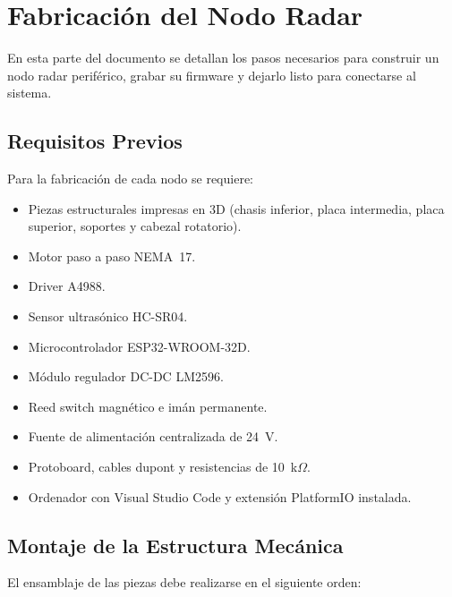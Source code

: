 
\chapter{Fabricación del Nodo Radar}
\label{anexo:fabricacion}

En esta parte del documento se detallan los pasos necesarios para construir un nodo radar periférico, grabar su firmware y dejarlo listo para conectarse al sistema.

\section{Requisitos Previos}

Para la fabricación de cada nodo se requiere:

\begin{itemize}
    \item Piezas estructurales impresas en 3D (chasis inferior, placa intermedia, placa superior, soportes y cabezal rotatorio).
    \item Motor paso a paso NEMA~17.
    \item Driver A4988.
    \item Sensor ultrasónico HC-SR04.
    \item Microcontrolador ESP32-WROOM-32D.
    \item Módulo regulador DC-DC LM2596.
    \item Reed switch magnético e imán permanente.
    \item Fuente de alimentación centralizada de 24~V.
    \item Protoboard, cables dupont y resistencias de 10~k$\Omega$.
    \item Ordenador con Visual Studio Code y extensión PlatformIO instalada.
\end{itemize}

\section{Montaje de la Estructura Mecánica}

El ensamblaje de las piezas debe realizarse en el siguiente orden:

